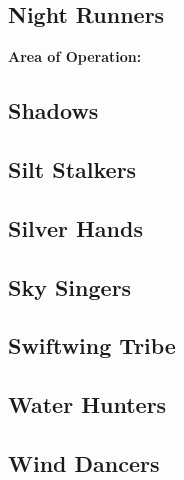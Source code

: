 \subsection{Night Runners}
\textbf{Area of Operation:}

\subsection{Shadows}
\subsection{Silt Stalkers}
\subsection{Silver Hands}
\subsection{Sky Singers}
\subsection{Swiftwing Tribe}
\subsection{Water Hunters}
\subsection{Wind Dancers}
